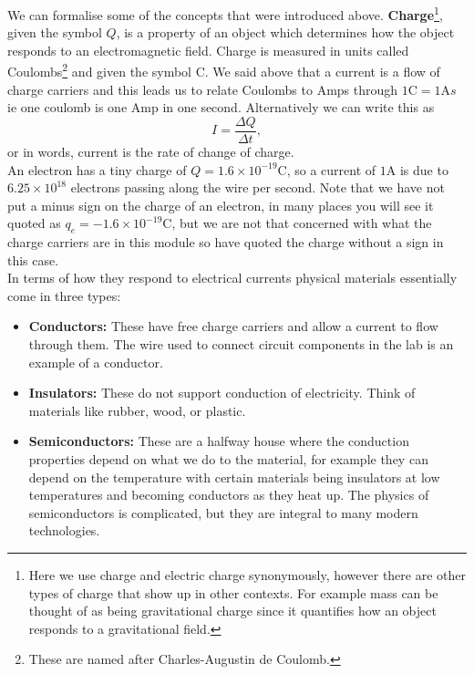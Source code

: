 \documentclass[a4paper,12pt]{book}
\begin{document}
We can formalise some of the concepts that were introduced above. \textbf{Charge}\footnote{Here we use charge and electric charge synonymously, however there are other types of charge that show up in other contexts. For example mass can be thought of as being gravitational charge since it quantifies how an object responds to a gravitational field.}, given the symbol $Q$, is a property of an object which determines how the object responds to an electromagnetic field. Charge is measured in units called Coulombs\footnote{These are named after Charles-Augustin de Coulomb.} and given the symbol $\text{C}$. We said above that a current is a flow of charge carriers and this leads us to relate Coulombs to Amps through $1\text{C}=1\text{A}s$ ie one coulomb is one Amp in one second. Alternatively we can write this as
\begin{equation}
I=\frac{\Delta Q}{\Delta t},
\label{eq: current definition}
\end{equation}
or in words, current is the rate of change of charge.\\

An electron has a tiny charge of $Q=1.6\times10^{-19}\text{C}$, so a current of $1\text{A}$ is due to $6.25\times 10^{18}$ electrons passing along the wire per second. Note that we have not put a minus sign on the charge of an electron, in many places you will see it quoted as $q_{e}=-1.6\times10^{-19}\text{C}$, but we are not that concerned with what the charge carriers are in this module so have quoted the charge without a sign in this case.\\

In terms of how they respond to electrical currents physical materials essentially come in three types:
\begin{itemize}
\setlength{\itemsep}{-5pt}
    \item \textbf{Conductors:} These have free charge carriers and allow a current to flow through them. The wire used to connect circuit components in the lab is an example of a conductor.
    \item \textbf{Insulators:} These do not support conduction of electricity. Think of materials like rubber, wood, or plastic.
    \item \textbf{Semiconductors:} These are a halfway house where the conduction properties depend on what we do to the material, for example they can depend on the temperature with certain materials being insulators at low temperatures and becoming conductors as they heat up. The physics of semiconductors is complicated, but they are integral to many modern technologies.
\end{itemize}  
\end{document}
